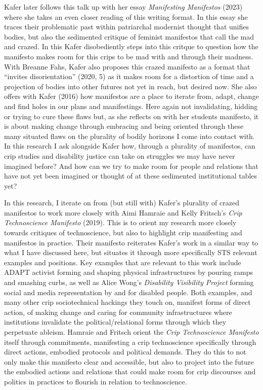 Kafer later follows this talk up with her essay \emph{Manifesting
Manifestos} (2023) where she takes an even closer reading of this
writing format. In this essay she traces their problematic past within
patriarchal modernist thought that unifies bodies, but also the
sedimented critique of feminist manifestos that call the mad and crazed.
In this Kafer disobediently steps into this critque to question how the
manifesto makes room for this crips to be mad with and through their
madness. With Breanne Fahs, Kafer also proposes this crazed manifesto as
a format that ``invites disorientation'' (2020, 5) as it makes room for
a distortion of time and a projection of bodies into other futures not
yet in reach, but desired now. She also offers with Kafer (2016) how
manifestos are a place to iterate from, adapt, change and find holes in
our plans and manifestings. Here again not invalidating, hidding or
trying to cure these flaws but, as she reflects on with her students
manifesto, it is about making change through embracing and being
oriented through these many situated flaws on the plurality of bodily
horizons I come into contact with. In this research I ask alongside
Kafer how, through a plurality of manifestos, can crip studies and
disability justice can take on struggles we may have never imagined
before? And how can we try to make room for people and relations that
have not yet been imagined or thought of at these sedimented
institutional tables yet?

In this research, I iterate on from (but still with) Kafer's plurality
of crazed manifestos to work more closely with Aimi Hamraie and Kelly
Fritsch's \emph{Crip Technoscience Manifesto} (2019). This is to orient
my research more closely towards critiques of technoscience, but also to
highlight crip manifesting and manifestos in practice. Their manifesto
reiterates Kafer's work in a similar way to what I have discussed here,
but situates it through more specifically STS relevant examples and
positions. Key examples that are relevant to this work include ADAPT
activist forming and shaping physical infrastructures by pouring ramps
and smashing curbs, as well as Alice Wong's \emph{Disability Visibility
Project} forming social and media representation by and for disabled
people. Both examples, and many other crip sociotechnical hackings they
touch on, manifest forms of direct action, of making change and caring
for community infrastructures where institutions invalidate the
political/relational forms through which they perpetuate ableism.
Hamraie and Fritsch orient the \emph{Crip Technoscience Manifesto}
itself through commitments, manifesting a crip technoscience
specifically through direct actions, embodied protocols and political
demands. They do this to not only make this manifesto clear and
accessible, but also to project into the future the embodied actions and
relations that could make room for crip discourses and politics in
practices to flourish in relation to technoscience.

